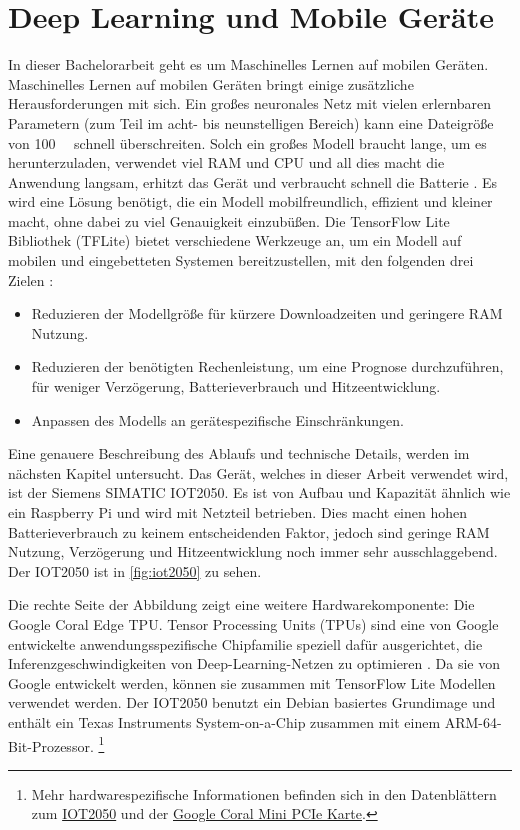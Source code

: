 \section{Deep Learning und Mobile Geräte}
In dieser Bachelorarbeit geht es um Maschinelles Lernen auf mobilen Geräten.
Maschinelles Lernen auf mobilen Geräten bringt einige
zusätzliche Herausforderungen mit sich.
Ein großes neuronales Netz mit vielen erlernbaren
Parametern (zum Teil im acht- bis neunstelligen Bereich) kann eine Dateigröße von
\qty{100}{\mega\byte} schnell überschreiten.
Solch ein großes Modell braucht lange, um es herunterzuladen,
verwendet viel RAM und CPU und all dies macht die Anwendung langsam,
erhitzt das Gerät und verbraucht schnell die Batterie \parencite[685]{book:hands-on-ml}.
Es wird eine Lösung benötigt, die ein Modell mobilfreundlich,
effizient und kleiner macht, ohne dabei zu viel Genauigkeit einzubüßen.
Die TensorFlow Lite Bibliothek (TFLite)
bietet verschiedene Werkzeuge an, um ein Modell auf mobilen und eingebetteten
Systemen bereitzustellen, mit den folgenden drei Zielen \parencite[685]{book:hands-on-ml}:
\begin{itemize}
  \item Reduzieren der Modellgröße für kürzere Downloadzeiten und
        geringere RAM Nutzung.
  \item Reduzieren der benötigten Rechenleistung, um eine Prognose durchzuführen,
        für weniger Verzögerung, Batterieverbrauch und Hitzeentwicklung.
  \item Anpassen des Modells an gerätespezifische Einschränkungen.
\end{itemize}
Eine genauere Beschreibung des Ablaufs und technische Details, werden
im nächsten Kapitel untersucht.
Das Gerät, welches in dieser Arbeit verwendet wird, ist der Siemens SIMATIC
IOT2050. Es ist von Aufbau und Kapazität ähnlich wie ein Raspberry Pi
und wird mit Netzteil betrieben.
Dies macht einen hohen Batterieverbrauch zu keinem entscheidenden Faktor,
jedoch sind geringe RAM Nutzung, Verzögerung und Hitzeentwicklung
noch immer sehr ausschlaggebend.
Der IOT2050 ist in \autoref{fig:iot2050} zu sehen.
\newpage

\noindent
Die rechte Seite der Abbildung zeigt eine weitere Hardwarekomponente:
Die Google Coral Edge TPU. Tensor Processing Units (TPUs)
sind eine von Google entwickelte anwendungsspezifische Chipfamilie
speziell dafür ausgerichtet, die Inferenzgeschwindigkeiten
von Deep-Learning-Netzen zu optimieren \parencite{online:edge-tpu}.
Da sie von Google entwickelt werden, können sie zusammen
mit TensorFlow Lite Modellen verwendet werden. Der IOT2050 benutzt
ein Debian basiertes Grundimage und enthält ein
Texas Instruments System-on-a-Chip zusammen mit einem ARM-64-Bit-Prozessor.
\footnote{Mehr hardwarespezifische Informationen befinden sich in den Datenblättern zum
  \href{https://support.industry.siemens.com/cs/document/109779016/simatic-iot2050}{IOT2050}
  und der \href{https://coral.ai/docs/mini-pcie/datasheet/}{Google Coral Mini PCIe Karte}.}


